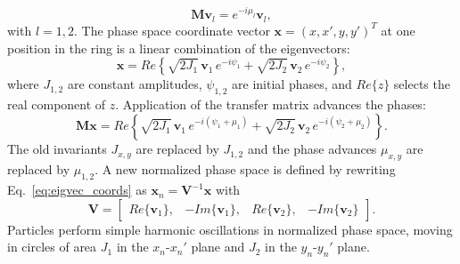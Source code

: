 %
\begin{equation} \label{eq:transfer_matrix_eig}
    \mathbf{M} \mathbf{v}_l = e^{-i\mu_l} \mathbf{v}_l,
\end{equation}
%
with $l = 1,2$. The phase space coordinate vector $\mathbf{x} = (x, x', y, y')^T$ at one position in the ring is a linear combination of the eigenvectors:
%
\begin{equation}
    \mathbf{x} = Re \left\{
        \sqrt{2 J_1} \, \mathbf{v}_1 \, e^{-i\psi_1}
        + \sqrt{2 J_2} \, \mathbf{v}_2 \, e^{-i\psi_2}
    \right\},
\end{equation}
%
where $J_{1,2}$ are constant amplitudes, $\psi_{1,2}$ are initial phases, and $Re\{z\}$ selects the real component of $z$. Application of the transfer matrix advances the phases:
%
\begin{equation}\label{eq:eigvec_coords}
    \mathbf{Mx} = Re \left\{
        \sqrt{2 J_1} \, \mathbf{v}_1 \, e^{-i(\psi_1 + \mu_1)}
        + \sqrt{2 J_2} \, \mathbf{v}_2 \, e^{-i(\psi_2 + \mu_2)}
    \right\}.
\end{equation}
%
The old invariants $J_{x,y}$ are replaced by $J_{1,2}$ and the phase advances $\mu_{x,y}$ are replaced by $\mu_{1,2}$. A new normalized phase space is defined by rewriting Eq.~\eqref{eq:eigvec_coords} as $\mathbf{x}_n = \mathbf{V}^{-1} \mathbf{x}$ with
%
\begin{equation}\label{eq:V_from_eigvecs}
    \mathbf{V} = 
    \begin{bmatrix}
        Re\{\mathbf{v}_1\}, & -Im\{\mathbf{v}_1\}, & Re\{\mathbf{v}_2\}, & -Im\{\mathbf{v}_2\}
    \end{bmatrix}.
\end{equation}
%
Particles perform simple harmonic oscillations in normalized phase space, moving in circles of area $J_1$ in the $x_n$-$x_n'$ plane and $J_2$ in the $y_n$-$y_n'$ plane.

